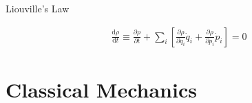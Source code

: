 \documentclass[12pt,a4paper]{book}
\begin{document}
Liouville's Law

\begin{eqnarray}
\frac{\mathrm d \rho}{\mathrm d t}\equiv \frac{\partial \rho}{\partial t} + \sum_i \left[ \frac{\partial \rho}{\partial q_i}\dot q_i + \frac{\partial \rho}{\partial p_i}\dot p_i \right] = 0
\end{eqnarray}































\chapter{Classical Mechanics}
\end{document}
